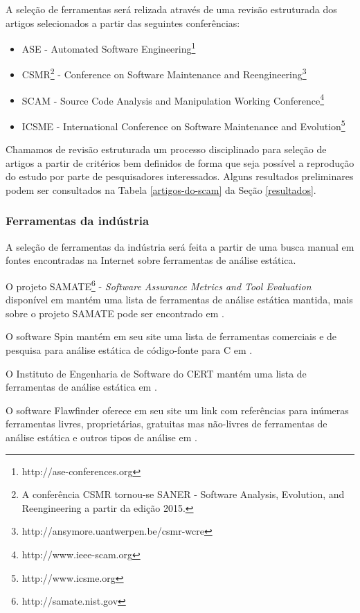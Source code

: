 \documentclass[12pt]{article}
\begin{document}
A seleção de ferramentas será relizada através de uma revisão estruturada dos
artigos selecionados a partir das seguintes conferências:

\begin{itemize}
  \item ASE - Automated Software
    Engineering\footnote{http://ase-conferences.org}
  \item CSMR\footnote{A conferência CSMR tornou-se SANER - Software Analysis,
    Evolution, and Reengineering a partir da edição 2015.} - Conference on
    Software Maintenance and
    Reengineering\footnote{http://ansymore.uantwerpen.be/csmr-wcre}
  \item SCAM - Source Code Analysis and Manipulation Working
    Conference\footnote{http://www.ieee-scam.org}
  \item ICSME - International Conference on Software Maintenance and
    Evolution\footnote{http://www.icsme.org}
\end{itemize}

Chamamos de revisão estruturada um processo disciplinado para seleção de
artigos a partir de critérios bem definidos de forma que seja possível a
reprodução do estudo por parte de pesquisadores interessados. Alguns
resultados preliminares podem ser consultados na Tabela \ref{artigos-do-scam}
da Seção \ref{resultados}.

\subsubsection{Ferramentas da indústria}

A seleção de ferramentas da indústria será feita a partir de uma busca manual
em fontes encontradas na Internet sobre ferramentas de análise estática.

O projeto SAMATE\footnote{
http://samate.nist.gov} - {\em Software Assurance Metrics and Tool Evaluation}
disponível em  mantém uma lista de
ferramentas de análise estática mantida, mais sobre o projeto SAMATE pode
ser encontrado em .

O software Spin mantém em seu site uma lista de ferramentas comerciais e de
pesquisa para análise estática de código-fonte para C em
.

O Instituto de Engenharia de Software do CERT mantém uma lista de ferramentas
de análise estática em .

O software Flawfinder oferece em seu site um link com referências para
inúmeras ferramentas livres, proprietárias, gratuitas mas não-livres de
ferramentas de análise estática e outros tipos de análise em
.
\end{document}
